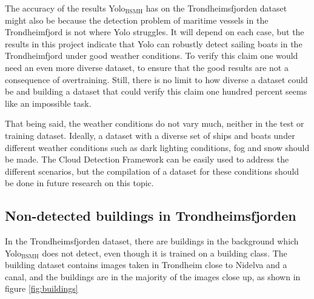 \vspace{3mm}

The accuracy of the results Yolo$_{\text{BSMH}}$ has on the Trondheimsfjorden dataset might also be because the detection problem of maritime vessels in the Trondheimfjord is not where Yolo struggles. It will depend on each case, but the results in this project indicate that Yolo can robustly detect sailing boats in the Trondheimfjord under good weather conditions. To verify this claim one would need an even more diverse dataset, to ensure that the good results are not a consequence of overtraining. Still, there is no limit to how diverse a dataset could be and building a dataset that could verify this claim one hundred percent seems like an impossible task. 

\vspace{3mm}

That being said, the weather conditions do not vary much, neither in the test or training dataset. Ideally, a dataset with a diverse set of ships and boats under different weather conditions such as dark lighting conditions, fog and snow should be made. The Cloud Detection Framework can be easily used to address the different scenarios, but the compilation of a dataset for these conditions should be done in future research on this topic.






\newpage

\subsection{Non-detected buildings in Trondheimsfjorden}
\label{sec:build_trf}
In the Trondheimsfjorden dataset, there are buildings in the background which Yolo$_{\text{BSMH}}$ does not detect, even though it is trained on a building class. The building dataset contains images taken in Trondheim close to Nidelva and a canal, and the buildings are in the majority of the images close up, as shown in figure \ref{fig:buildings}

